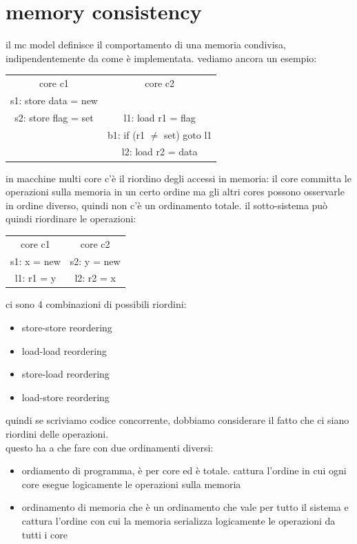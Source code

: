 \documentclass[12pt, oneside]{extbook} %
\begin{document}
\section{memory consistency}
il mc model definisce il comportamento di una memoria condivisa, indipendentemente da come è implementata. vediamo ancora un esempio:
\begin{table}[!h]
	\begin{tabular}{|c|c|}
		core c1 & core c2\\
		s1: store data = new & \\
		s2: store flag = set & l1: load r1 = flag\\
		 & b1: if (r1 $\neq$ set) goto l1\\
		 & l2: load r2 = data\\
	\end{tabular}
\end{table}
in macchine multi core c'è il riordino degli accessi in memoria: il core committa le operazioni sulla memoria in un certo ordine ma gli altri cores possono osservarle in ordine diverso, quindi non c'è un ordinamento totale. il sotto-sistema può quindi riordinare le operazioni: 
\begin{table}[!h]
	\begin{tabular}{|c|c|}
		core c1 & core c2\\
		s1: x = new & s2: y = new\\
		l1: r1 = y & l2: r2 = x\\
	\end{tabular}
\end{table}
ci sono 4 combinazioni di possibili riordini:
\begin{itemize}
	\item store-store reordering
	\item load-load reordering
	\item store-load reordering
	\item load-store reordering
\end{itemize}
quindi se scriviamo codice concorrente, dobbiamo considerare il fatto che ci siano riordini delle operazioni.\\ questo ha a che fare con due ordinamenti diversi:
\begin{itemize}
\item ordiamento di programma, è per core ed è totale. cattura l'ordine in cui ogni core esegue logicamente le operazioni sulla memoria 
\item ordinamento di memoria che è un ordinamento che vale per tutto il sistema e cattura l'ordine con cui la memoria serializza logicamente le operazioni da tutti i core
\end{itemize}
\end{document}

